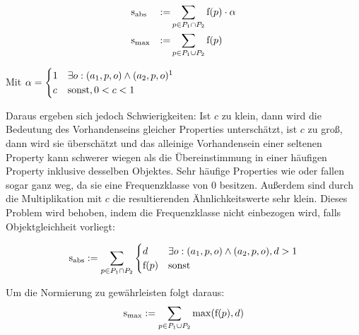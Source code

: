 \begin{subequations}%
\begin{align}
\textnormal{s}&_{\textnormal{abs}} 	&:=& \sum_{p\in P_1\cap P_2} \textnormal{f}(p)\cdot \alpha \\
\textnormal{s}&_{\max}		&:=& \sum_{p\in P_1\cup P_2} \textnormal{f}(p)
\end{align}
\end{subequations}

Mit
$\alpha = 
\begin{cases}
1 &\exists o: (a_1,p,o) \land (a_2,p,o)\footnotemark{}\\%
c &\textnormal{sonst}, 0 < c < 1
\end{cases}$

Daraus ergeben sich jedoch Schwierigkeiten:
Ist $c$ zu klein, dann wird die Bedeutung des Vorhandenseins gleicher Properties unterschätzt, ist $c$ zu groß, dann wird sie überschätzt und das alleinige Vorhandensein einer seltenen Property 
kann schwerer wiegen als die Übereinstimmung in einer häufigen Property inklusive desselben Objektes. Sehr häufige Properties wie  oder  fallen sogar ganz weg,
da sie eine Frequenzklasse von 0 besitzen. Außerdem sind durch die Multiplikation mit $c$ die resultierenden Ähnlichkeitswerte sehr klein.
Dieses Problem wird behoben, indem die Frequenzklasse nicht einbezogen wird, falls Objektgleichheit vorliegt:

\begin{equation}
\s_{\textnormal{abs}} := \sum_{p\in P_1\cap P_2}
\begin{cases}
d &\exists o: (a_1,p,o) \land (a_2,p,o), d > 1\\
\f(p) &\textnormal{sonst}\\%
\end{cases}
\end{equation}

Um die Normierung zu gewährleisten folgt daraus:
\begin{equation}
\textnormal{s}_{\max} := \sum_{p\in P_1\cup P_2} \max(\textnormal{f}(p),d)\\
\end{equation}

